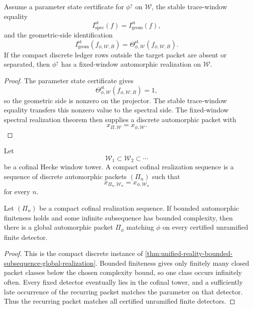 \begin{theorem}
\label{thm:unified-reality-parameter-state-trace-fixed-window}
Assume a parameter state certificate for $\phi^{\uparrow}$ on
$\mathcal W$, the stable trace-window equality
$$
I_{\mathrm{spec}}^{\mathrm{st}}(f)
=
I_{\mathrm{geom}}^{\mathrm{st}}(f),
$$
and the geometric-side identification
$$
I_{\mathrm{geom}}^{\mathrm{st}}(f_{\phi,\mathcal W,B})
=
\Theta_{\phi,\mathcal W}^{\mathrm{st}}(f_{\phi,\mathcal W,B}).
$$
If the compact discrete ledger rows outside the target packet are absent
or separated, then $\phi^{\uparrow}$ has a fixed-window automorphic
realization on $\mathcal W$.
\end{theorem}
\begin{proof}
The parameter state certificate gives
$$
\Theta_{\phi,\mathcal W}^{\mathrm{st}}(f_{\phi,\mathcal W,B})=1,
$$
so the geometric side is nonzero on the projector. The stable
trace-window equality transfers this nonzero value to the spectral
side. The fixed-window spectral realization theorem then supplies a
discrete automorphic packet with
$$
x_{\Pi,\mathcal W}=x_{\phi,\mathcal W}.
$$
\end{proof}

\begin{definition}
\label{def:unified-reality-compact-cofinal-realization-sequence}
Let
$$
\mathcal W_1\subset\mathcal W_2\subset\cdots
$$
be a cofinal Hecke window tower. A compact cofinal realization sequence
is a sequence of discrete automorphic packets $(\Pi_n)$ such that
$$
x_{\Pi_n,\mathcal W_n}=x_{\phi,\mathcal W_n}
$$
for every $n$.
\end{definition}

\begin{theorem}
\label{thm:unified-reality-compact-bounded-subsequence-globalization}
Let $(\Pi_n)$ be a compact cofinal realization sequence. If bounded
automorphic finiteness holds and some infinite subsequence has bounded
complexity, then there is a global automorphic packet $\Pi_{\phi}$
matching $\phi$ on every certified unramified finite detector.
\end{theorem}
\begin{proof}
This is the compact discrete instance of
\autoref{thm:unified-reality-bounded-subsequence-global-realization}.
Bounded finiteness gives only finitely many closed packet classes below
the chosen complexity bound, so one class occurs infinitely often. Every
fixed detector eventually lies in the cofinal tower, and a sufficiently
late occurrence of the recurring packet matches the parameter on that
detector. Thus the recurring packet matches all certified unramified
finite detectors.
\end{proof}

